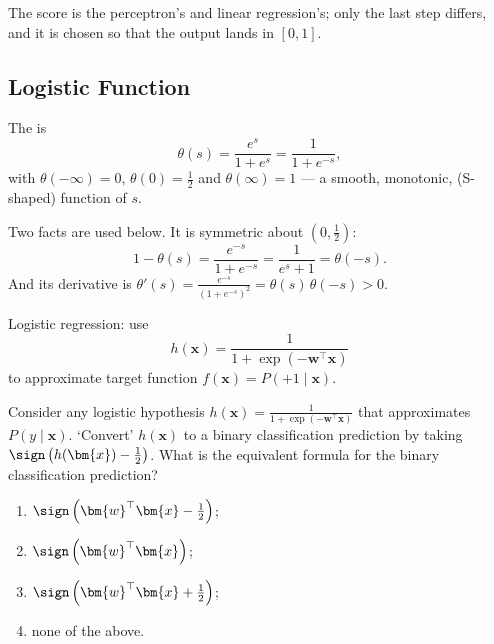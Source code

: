 The score is the perceptron's and linear regression's; only the last step
differs, and it is chosen so that the output lands in \([0, 1]\).

\subsection{Logistic Function}

\begin{center}
    \thetacurve[1.2]
\end{center}

\begin{definition}\label{def:logistic}
    The  is
    \[
        \theta(s) = \frac{e^s}{1 + e^s} = \frac{1}{1 + e^{-s}} ,
    \]
    with \(\theta(-\infty) = 0\), \(\theta(0) = \frac{1}{2}\) and
    \(\theta(\infty) = 1\) --- a smooth, monotonic, 
    (S-shaped) function of \(s\).
\end{definition}

Two facts are used below. It is symmetric about \((0, \frac{1}{2})\):
\[
    1 - \theta(s) = \frac{e^{-s}}{1 + e^{-s}} = \frac{1}{e^s + 1} = \theta(-s) .
\]
And its derivative is \(\theta'(s) = \frac{e^{-s}}{(1 + e^{-s})^2} =
\theta(s)\, \theta(-s) > 0\).

\begin{moral}
    Logistic regression: use
    \[
        h(\bm{x}) = \frac{1}{1 + \exp(-\bm{w}^\top \bm{x})}
    \]
    to approximate target function \(f(\bm{x}) = P(+1 \mid \bm{x})\).
\end{moral}

\begin{exercise}
    Consider any logistic hypothesis \(h(\bm{x}) = \frac{1}{1 + \exp(-\bm{w}^\top
    \bm{x})}\) that approximates \(P(y \mid \bm{x})\). `Convert' \(h(\bm{x})\)
    to a binary classification prediction by taking \(\sign \left( h(\bm{x}) -
    \frac{1}{2} \right)\). What is the equivalent formula for the binary
    classification prediction?
    \begin{enumerate}[(1)]
        \item \(\sign \left( \bm{w}^\top \bm{x} - \frac{1}{2} \right)\);
        \item \(\sign \left( \bm{w}^\top \bm{x} \right)\);
        \item \(\sign \left( \bm{w}^\top \bm{x} + \frac{1}{2} \right)\);
        \item none of the above.
    \end{enumerate}
\end{exercise}

